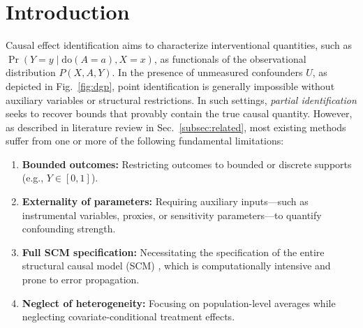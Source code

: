 \section{Introduction}
\label{sec:intro}

Causal effect identification aims to characterize interventional quantities, such as $\Pr(Y=y \mid \mathrm{do}(A=a),X=x)$, as functionals of the observational distribution $P(X,A,Y)$. In the presence of unmeasured confounders $U$, as depicted in Fig.~\ref{fig:dgp}, point identification is generally impossible without auxiliary variables or structural restrictions. In such settings, \textit{partial identification} seeks to recover bounds that provably contain the true causal quantity. However, as described in literature review in Sec.~\ref{subsec:related}, most existing methods suffer from one or more of the following fundamental limitations: 
\begin{enumerate}[label=\textbf{(Lim-\arabic*)}, leftmargin=*, topsep=0pt]
    \item \textbf{Bounded outcomes:} Restricting outcomes to bounded or discrete supports (e.g., $Y \in [0,1]$).
    \item \textbf{Externality of parameters:} Requiring auxiliary inputs—such as instrumental variables, proxies, or sensitivity parameters—to quantify confounding strength.
    \item \textbf{Full SCM specification:} Necessitating the specification of the entire structural causal model (SCM) \citep{pearl:2k}, which is computationally intensive and prone to error propagation.
    \item \textbf{Neglect of heterogeneity:} Focusing on population-level averages while neglecting covariate-conditional treatment effects.
\end{enumerate}

